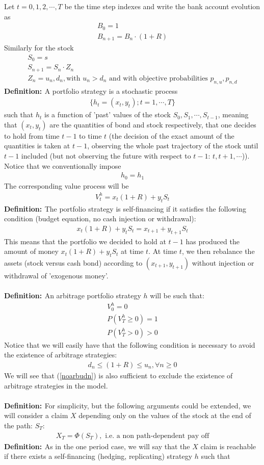 \documentclass[a4paper,10pt]{report}
\theoremstyle{plain}
\theoremstyle{definition}
\newcommand\be{\begin{eqnarray}}    %
\newcommand\ee{\end{eqnarray}}
\newcommand{\DEF} {{\bf{Definition: }}}
\begin{document}
Let $t=0,1,2,\cdots ,T$ be the time step indexes and write the bank account evolution as
\be 
B_0=1\\
B_{n+1}=B_n\cdot (1+R)
\ee
Similarly for the stock
\be 
S_0=s\\
S_{n+1}=S_n\cdot Z_n \\
Z_n=u_n, d_n, \mbox{with $u_n>d_n$ and with objective probabilities $p_{n,u}, p_{n,d}$}
\ee
\DEF A portfolio strategy is a stochastic process
\be 
\{h_t=(x_t,y_t); t=1,\cdots ,T \}
\ee
such that $h_t$ is a function of 'past' values of the stock $S_0,S_1,\cdots, S_{t-1}$, meaning that $(x_t,y_t)$ are the quantities of bond and stock respectively, that one decides to hold from time $t-1$ to time $t$ (the decision of the exact amount of the quantities is taken at $t-1$, observing the whole past trajectory of the stock until $t-1$ included (but not observing the future with respect to $t-1$: $t, t+1,\cdots$)). 
Notice that we conventionally impose 
\be 
h_0=h_1
\ee
The corresponding value process will be 
\be 
V^h_t=x_t(1+R)+y_t S_t
\label{vstrat}
\ee
\DEF The portfolio strategy is self-financing if it satisfies the following condition (budget equation, no cash injection or withdrawal):
\be 
x_t(1+R)+y_t S_t=x_{t+1}+y_{t+1} S_t
\ee
This means that the portfolio we decided to hold at $t-1$ has produced the amount of money $x_t(1+R)+y_t S_t$ at time $t$.
At time $t$, we then rebalance the assets (stock versus cash bond) according to $(x_{t+1}, y_{t+1})$ without injection or withdrawal of 'exogenous money'. \\ \\
\DEF An arbitrage portfolio strategy $h$ will be such that:
\be
V_0^h=0\\
P\left(V_T^h\ge 0\right)=1\\
P\left(V_T^h> 0\right)>0
\label{multiarbstrategy}
\ee
Notice that we will easily have that the following condition is necessary to avoid the existence of arbitrage strategies:
\be 
d_n \le (1+R) \le u_n, \forall n\ge 0
\label{noarbudn}
\ee
We will see that (\ref{noarbudn}) is also sufficient to exclude the existence of arbitrage strategies in the model. \\ \\
\DEF For simplicity, but the following arguments could be extended, we will consider a claim $X$ depending only on the values of the stock at the end of the path: $S_T$:
\be 
X_T= \Phi(S_T), \mbox{ i.e. a non path-dependent pay off}
\ee
\DEF As in the one period case, we will say that the $X$ claim is reachable if there exists a self-financing (hedging, replicating) strategy $h$ such that 
\end{document}
